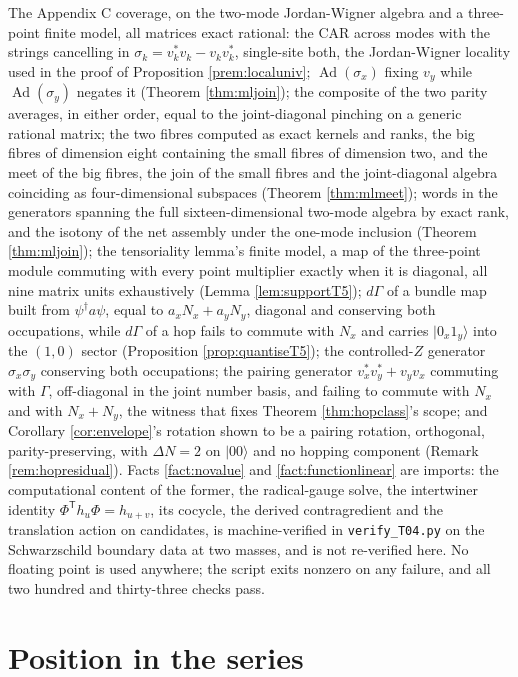 \documentclass[11pt]{article}
\theoremstyle{definition}
\begin{document}
The Appendix C coverage, on the two-mode Jordan-Wigner algebra and a three-point finite model, all matrices exact rational: the CAR across modes with the strings cancelling in $\sigma_k = v_k^{*}v_k - v_kv_k^{*}$, single-site both, the Jordan-Wigner locality used in the proof of Proposition \ref{prem:localuniv}; $\operatorname{Ad}(\sigma_x)$ fixing $v_y$ while $\operatorname{Ad}(\sigma_y)$ negates it (Theorem \ref{thm:mljoin}); the composite of the two parity averages, in either order, equal to the joint-diagonal pinching on a generic rational matrix; the two fibres computed as exact kernels and ranks, the big fibres of dimension eight containing the small fibres of dimension two, and the meet of the big fibres, the join of the small fibres and the joint-diagonal algebra coinciding as four-dimensional subspaces (Theorem \ref{thm:mlmeet}); words in the generators spanning the full sixteen-dimensional two-mode algebra by exact rank, and the isotony of the net assembly under the one-mode inclusion (Theorem \ref{thm:mljoin}); the tensoriality lemma's finite model, a map of the three-point module commuting with every point multiplier exactly when it is diagonal, all nine matrix units exhaustively (Lemma \ref{lem:supportT5}); $d\Gamma$ of a bundle map built from $\psi^{\dagger}a\psi$, equal to $a_xN_x + a_yN_y$, diagonal and conserving both occupations, while $d\Gamma$ of a hop fails to commute with $N_x$ and carries $|0_x 1_y\rangle$ into the $(1,0)$ sector (Proposition \ref{prop:quantiseT5}); the controlled-$Z$ generator $\sigma_x\sigma_y$ conserving both occupations; the pairing generator $v^{*}_xv^{*}_y + v_yv_x$ commuting with $\Gamma$, off-diagonal in the joint number basis, and failing to commute with $N_x$ and with $N_x + N_y$, the witness that fixes Theorem \ref{thm:hopclass}'s scope; and Corollary \ref{cor:envelope}'s rotation shown to be a pairing rotation, orthogonal, parity-preserving, with $\Delta N = 2$ on $|00\rangle$ and no hopping component (Remark \ref{rem:hopresidual}). Facts \ref{fact:novalue} and \ref{fact:functionlinear} are imports: the computational content of the former, the radical-gauge solve, the intertwiner identity $\Phi^{\mathsf T}h_u\Phi = h_{u+v}$, its cocycle, the derived contragredient and the translation action on candidates, is machine-verified in \texttt{verify\_T04.py} on the Schwarzschild boundary data at two masses, and is not re-verified here. No floating point is used anywhere; the script exits nonzero on any failure, and all two hundred and thirty-three checks pass.


\section*{Position in the series}
\end{document}
